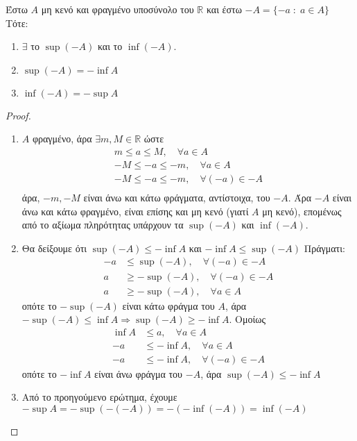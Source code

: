 \documentclass[main.tex]{subfiles}
\begin{document}
\begin{mypropbox}
  Έστω $ A $ μη κενό και φραγμένο υποσύνολο του $ \mathbb{R} $ και έστω 
  $ -A = \{ -a \; : \; a \in A \} $ Τότε:
  \begin{enumerate}
    \item $ \exists $ το $ \sup (-A) $ και το $ \inf (-A) $.
    \item $ \sup (-A) = - \inf A $
    \item $ \inf (-A) = - \sup A $
  \end{enumerate}
\end{mypropbox}
\begin{proof}
\item {}
  \begin{enumerate}
    \item $ A $ φραγμένο, άρα $ \exists m,M \in \mathbb{R} $ ώστε 
      \begin{gather*} 
        m  \leq  a \leq M, \quad \forall a \in A \\
        -M  \leq - a \leq -m, \quad \forall a \in A \\
        -M  \leq - a \leq -m, \quad \forall (-a) \in -A \\
      \end{gather*}
      άρα, $ -m,-M $ είναι άνω και κάτω φράγματα, αντίστοιχα, του $ -A $. Άρα 
      $ -A $ είναι άνω και κάτω φραγμένο, είναι επίσης και μη κενό (γιατί $A$ μη κενό), 
      επομένως από το αξίωμα πληρότητας υπάρχουν τα $ \sup (-A) $ και $ \inf (-A) $.
    \item Θα δείξουμε ότι $ \sup (-A) \leq - \inf A $ και $ - \inf A \leq \sup (-A) $
      Πράγματι:
      \begin{align*}
        -a &\leq \sup (-A), \quad \forall (-a) \in -A \\
        a &\geq -\sup (-A), \quad \forall (-a) \in -A \\
        a &\geq -\sup (-A), \quad \forall a \in A 
      \end{align*}
      οπότε το $ -\sup(-A) $ είναι κάτω φράγμα του $A$, άρα $ - \sup (-A) \leq \inf A
      \Rightarrow \sup (-A) \geq -\inf A $. Ομοίως 
      \begin{align*}
        \inf A &\leq a, \quad \forall a \in A \\
        - a &\leq - \inf A, \quad \forall a \in A \\
        - a &\leq - \inf A, \quad \forall (-a) \in -A 
      \end{align*}
      οπότε το $ - \inf A $ είναι άνω φράγμα του $ -A $, άρα $ \sup (-A) \leq - \inf
      A $
    \item Από το προηγούμενο ερώτημα, έχουμε $ - \sup A = - \sup (-(-A)) = - (- \inf (-A)) = \inf (-A) $ 
  \end{enumerate}
\end{proof}
\end{document}
